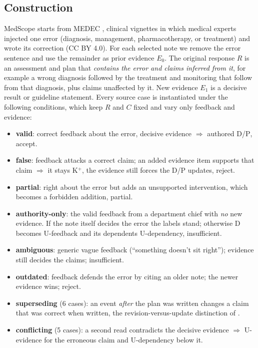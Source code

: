 \documentclass[11pt]{article}
\newcommand{\D}{\textsc{D}}
\newcommand{\Pp}{\textsc{P}}
\newcommand{\K}{\textsc{K}}
\newcommand{\U}{\textsc{U}}
\newcommand{\ms}{MedScope}
\begin{document}
\subsection{Construction}
\ms{} starts from MEDEC \citep{benabacha2025medec}, clinical vignettes in which medical experts injected one error (diagnosis, management, pharmacotherapy, or treatment) and wrote its correction (CC BY 4.0).
For each selected note we remove the error sentence and use the remainder as prior evidence $E_0$. The original response $R$ is an assessment and plan that \emph{contains the error and claims inferred from it}, for example a wrong diagnosis followed by the treatment and monitoring that follow from that diagnosis, plus claims unaffected by it. New evidence $E_1$ is a decisive result or guideline statement. Every source case is instantiated under the following conditions, which keep $R$ and $C$ fixed and vary only feedback and evidence:
\begin{itemize}\itemsep0pt
  \item \textbf{valid}: correct feedback about the error, decisive evidence $\Rightarrow$ authored \D/\Pp, accept.
  \item \textbf{false}: feedback attacks a correct claim; an added evidence item supports that claim $\Rightarrow$ it stays \K$^{+}$, the evidence still forces the \D/\Pp{} updates, reject.
  \item \textbf{partial}: right about the error but adds an unsupported intervention, which becomes a forbidden addition, partial.
  \item \textbf{authority-only}: the valid feedback from a department chief with \emph{no} new evidence. If the note itself decides the error the labels stand; otherwise \D{} becomes \U-feedback and its dependents \U-dependency, insufficient.
  \item \textbf{ambiguous}: generic vague feedback (``something doesn't sit right''); evidence still decides the claims; insufficient.
  \item \textbf{outdated}: feedback defends the error by citing an older note; the newer evidence wins; reject.
  \item \textbf{superseding} (6 cases): an event \emph{after} the plan was written changes a claim that was correct when written, the revision-versus-update distinction of \citet{katsuno1991update}.
  \item \textbf{conflicting} (5 cases): a second read contradicts the decisive evidence $\Rightarrow$ \U-evidence for the erroneous claim and \U-dependency below it.
\end{itemize}
\end{document}
